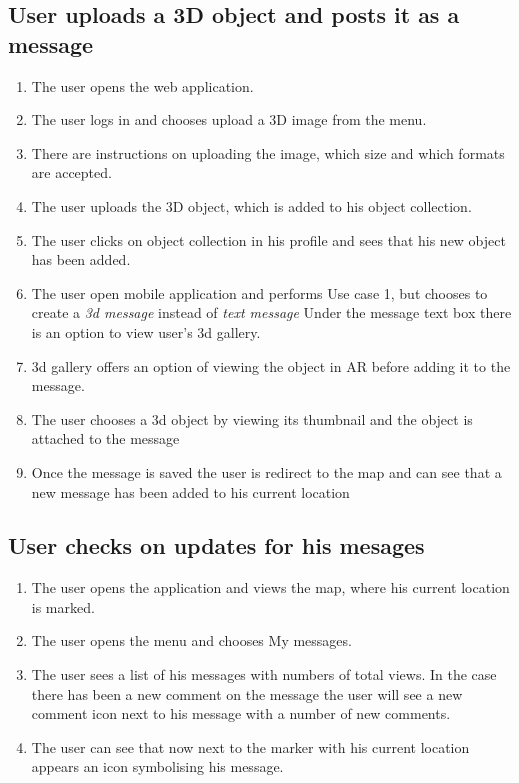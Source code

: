 \documentclass[thesis=M,english]{FITthesis}[2012/10/20]
\begin{document}
\subsection{User uploads a 3D object and posts it as a message}
\begin{enumerate}
	\item The user opens the web application.
	\item The user logs in and chooses upload a 3D image from the menu.
	\item There are instructions on uploading the image, which size and which formats are accepted.
	\item The user uploads the 3D object, which is added to his object collection.
	\item The user clicks on object collection in his profile and sees that his new object has been added.
	\item The user open mobile application and performs Use case 1, but chooses to create a \textit{3d message} instead of \textit{text message} Under the message text box there is an option to view user's 3d gallery.
	\item 3d gallery offers an option of viewing the object in AR before adding it to the message.
	\item The user chooses a 3d object by viewing its thumbnail and the object is attached to the message
	\item Once the message is saved the user is redirect to the map and can see that a new message has been added to his current location
\end{enumerate}

\subsection{User checks on updates for his mesages}
\begin{enumerate}
	\item The user opens the application and views the map, where his current location is marked.
	\item The user opens the menu and chooses My messages.
	\item The user sees a list of his messages with numbers of total views. In the case there has been a new comment on the message the user will see a new comment icon next to his message with a number of new comments.
	\item The user can see that now next to the marker with his current location appears an icon symbolising his message.
\end{enumerate}
\end{document}
